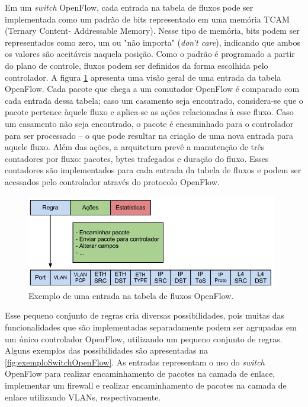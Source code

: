 Em um \textit{switch} OpenFlow, cada entrada na tabela de 
fluxos pode ser implementada como um padrão de bits 
representado em uma memória TCAM (Ternary Content-
Addressable Memory). Nesse tipo de memória, bits podem
ser representados como zero, um ou "não importa" 
(\textit{don't care}), indicando que ambos os valores são
aceitáveis naquela posição. Como o padrão é programado
a partir do plano de controle, fluxos podem ser definidos da 
forma escolhida pelo controlador. A figura \ref{fig:fluxoopenflow}
apresenta uma visão geral de uma entrada da tabela OpenFlow.
Cada pacote que chega a um comutador OpenFlow é comparado
com cada entrada dessa tabela; caso um casamento seja encontrado,
considera-se que o pacote pertence àquele fluxo e aplica-se
as ações relacionadas à esse fluxo. Caso um casamento não
seja encontrado, o pacote é encaminhado para o controlador 
para ser processado -- o que pode resultar na criação de uma
nova entrada para aquele fluxo. Além das ações, a arquitetura
prevê a manutenção de três contadores por fluxo: pacotes,
 bytes trafegados e duração do fluxo. Esses contadores são 
implementados para cada entrada da tabela de fluxos e 
podem ser acessados pelo controlador através do protocolo
OpenFlow.

\begin{figure}[hb] \centering
\includegraphics[width=110mm]{fluxoOpenflow.png} 
\caption{Exemplo de uma entrada na tabela de fluxos OpenFlow.} 
\label{fig:fluxoopenflow} 
\end{figure}

Esse pequeno conjunto de regras cria diversas possibilidades,
pois muitas das funcionalidades que são implementadas 
separadamente podem ser agrupadas em um único controlador
OpenFlow, utilizando um pequeno conjunto de regras. Alguns 
exemplos das possibilidades são apresentadas na \ref{fig:exemploSwitchOpenFlow}.
As entradas representam o uso do \textit{switch} OpenFlow
para realizar encaminhamento de pacotes na camada de enlace,
implementar um firewall e realizar encaminhamento de pacotes 
na camada de enlace utilizando VLANs, respectivamente.

